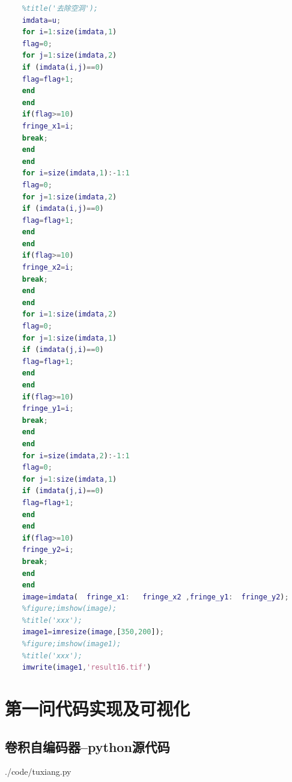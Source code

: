 \documentclass{whutmod}
\begin{document}
\begin{lstlisting}[language=matlab]
	%figure;imshow(u);
	%title('去除空洞');
	imdata=u;
	for i=1:size(imdata,1)
	flag=0;
	for j=1:size(imdata,2)
	if (imdata(i,j)==0)
	flag=flag+1;
	end
	end
	if(flag>=10)
	fringe_x1=i;
	break;
	end
	end
	for i=size(imdata,1):-1:1
	flag=0;
	for j=1:size(imdata,2)
	if (imdata(i,j)==0)
	flag=flag+1;
	end
	end
	if(flag>=10)
	fringe_x2=i;
	break;
	end
	end
	for i=1:size(imdata,2)
	flag=0;
	for j=1:size(imdata,1)
	if (imdata(j,i)==0)
	flag=flag+1;
	end
	end
	if(flag>=10)
	fringe_y1=i;
	break;
	end
	end
	for i=size(imdata,2):-1:1
	flag=0;
	for j=1:size(imdata,1)
	if (imdata(j,i)==0)
	flag=flag+1;
	end
	end
	if(flag>=10)
	fringe_y2=i;
	break;
	end
	end
	image=imdata(  fringe_x1:   fringe_x2 ,fringe_y1:  fringe_y2);
	%figure;imshow(image);
	%title('xxx');
	image1=imresize(image,[350,200]);
	%figure;imshow(image1);
	%title('xxx');
	imwrite(image1,'result16.tif')

	\end{lstlisting}
	\section{第一问代码实现及可视化}
		\subsection*{卷积自编码器--python源代码}
			 {./code/tuxiang.py}
\end{document}
